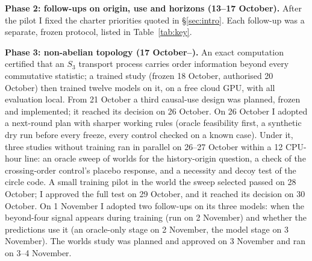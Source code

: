 \documentclass[11pt,a4paper]{article}
\DeclareRobustCommand{\_}{\ifmmode\origunderscore\else\textunderscore\allowbreak\fi}
\begin{document}
\textbf{Phase 2: follow-ups on origin, use and horizons (13--17 October).} After the pilot I
fixed the charter priorities quoted in \S\ref{sec:intro}. Each follow-up was a separate,
frozen protocol, listed in Table~\ref{tab:key}.

\textbf{Phase 3: non-abelian topology (17 October--).} An exact computation certified that an
$S_3$ transport process carries order information beyond every commutative statistic; a
trained study (frozen 18 October, authorised 20 October) then trained twelve models on it, on
a free cloud GPU, with all evaluation local. From 21 October a third causal-use design was
planned, frozen and implemented; it reached its decision on 26 October. On 26 October I adopted
a next-round plan with sharper working rules (oracle feasibility first, a synthetic dry run before
every freeze, every control checked on a known case). Under it, three studies without training
ran in parallel on 26--27 October within a 12 CPU-hour line: an oracle sweep of worlds for the
history-origin question, a check of the crossing-order control's placebo response, and a
necessity and decoy test of the circle code. A small training pilot in the world the sweep
selected passed on 28 October; I approved the full test on 29 October, and it reached its
decision on 30 October. On 1 November I adopted two follow-ups on its three models: when the
beyond-four signal appears during training (run on 2 November) and whether the predictions use
it (an oracle-only stage on 2 November, the model stage on 3 November). The worlds study was
planned and approved on 3 November and ran on 3--4 November.
\end{document}
